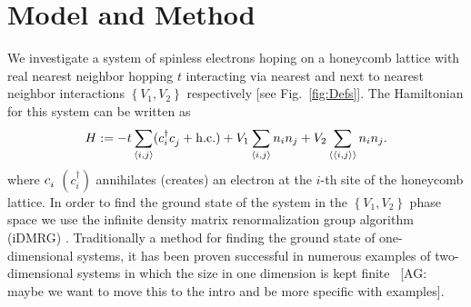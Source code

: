 \documentclass[aps,prx,10pt,twocolumn,floatfix,superscriptaddress,showpacs,numerical,footinbib]{revtex4-1}
\newcommand{\noteAG}[1]{{\color{blue} [AG: #1]}}
\newcommand{\bs}[1]{{\boldsymbol{#1}}}
\begin{document}
\section{\label{sec:modandmeth}Model and Method}
%
We investigate a system of spinless electrons hoping on a honeycomb lattice with real nearest neighbor hopping $t$ interacting via nearest and next to nearest neighbor interactions 
$\left\lbrace V_{1},V_{2}\right\rbrace$ respectively [see Fig.~\ref{fig:Defs}]. 
%
The Hamiltonian for this system can be written as
\begin{equation}
%
 H:=-t\sum_{\left\langle i,j\right\rangle}(c^{\dagger}_{i}c^{\vphantom{\dagger}}_{j}+ \mathrm{h.c.})+
V_{1}\sum_{\left\langle i,j\right\rangle }n_{i}n_{j}+
%
V_{2}\sum_{\left\langle \left\langle i,j\right\rangle \right\rangle }n_{i}n_{j}.
%
\label{eq:H}
\end{equation}
%
where $c_{i}^{\vphantom{\dagger}}$ $(c^{\dagger}_{i})$  annihilates (creates) an electron at the $i$-th site of the honeycomb lattice.
%
%
In order to find the ground state of the system in the $\left\lbrace V_{1},V_{2}\right\rbrace$ phase space
we use the infinite density matrix renormalization group algorithm (iDMRG) \cite{M08,W92,KZM13}.
%
Traditionally a method for finding the ground state of one-dimensional systems, it has been proven successful in numerous examples of two-dimensional systems in which the size in one dimension is kept finite~\cite{papers}\noteAG{maybe we want to move this to the intro and be more specific with examples}.
\end{document}
